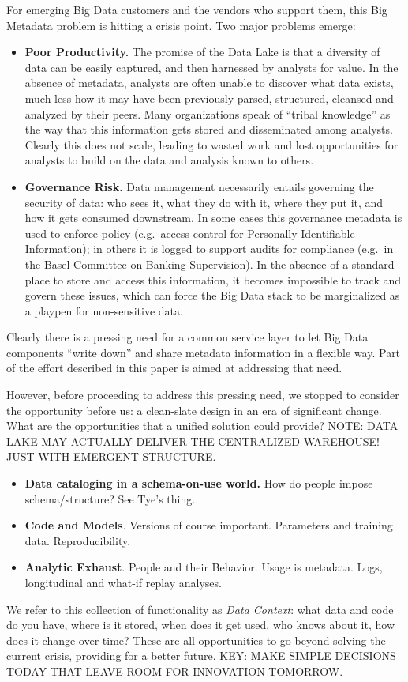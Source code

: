 \documentclass{sig-alternate}
\begin{document}
For emerging Big Data customers and the vendors who support them, this Big Metadata problem is hitting a crisis point.  Two major problems emerge:
\begin{itemize}
\item \textbf{Poor Productivity.} The promise of the Data Lake is that a diversity of data can be easily captured, and then harnessed by analysts for value. In the absence of metadata, analysts are often unable to discover what data exists, much less how it may have been previously parsed, structured, cleansed and analyzed by their peers. Many organizations speak of ``tribal knowledge'' as the way that this information gets stored and disseminated among analysts. Clearly this does not scale, leading to wasted work and lost opportunities for analysts to build on the data and analysis known to others.
\item \textbf{Governance Risk.} Data management necessarily entails governing the security of data: who sees it, what they do with it, where they put it, and how it gets consumed downstream. In some cases this governance metadata is used to enforce policy (e.g.\ access control for Personally Identifiable Information); in others it is logged to support audits for compliance (e.g.\ in the Basel Committee on Banking Supervision). In the absence of a standard place to store and access this information, it becomes impossible to track and govern these issues, which can force the Big Data stack to be marginalized as a playpen for non-sensitive data.
\end{itemize}

Clearly there is a pressing need for a common service layer to let Big Data components ``write down'' and share metadata information in a flexible way. Part of the effort described in this paper is aimed at addressing that need.

However, before proceeding to address this pressing need, we stopped to consider the opportunity before us: a clean-slate design in an era of significant change. What are the opportunities that a unified solution could provide?  NOTE: DATA LAKE MAY ACTUALLY DELIVER THE CENTRALIZED WAREHOUSE! JUST WITH EMERGENT STRUCTURE.

\begin{itemize}
\item \textbf{Data cataloging in a schema-on-use world.}  How do people impose schema/structure? See Tye's thing.
\item \textbf{Code and Models}.  Versions of course important. Parameters and training data. Reproducibility.  
\item \textbf{Analytic Exhaust}. People and their Behavior.  Usage is metadata. Logs, longitudinal and what-if replay analyses.
\end{itemize}

We refer to this collection of functionality as \emph{Data Context}: what data and code do you have, where is it stored, when does it get used, who knows about it, how does it change over time?  These are all opportunities to go beyond solving the current crisis, providing for a better future.  KEY: MAKE SIMPLE DECISIONS TODAY THAT LEAVE ROOM FOR INNOVATION TOMORROW.
\end{document}
